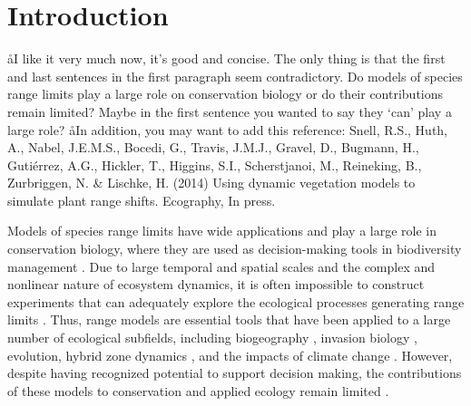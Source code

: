\section*{Introduction}
\aa{I like it very much now, it's good and concise. The only thing is that the first and last sentences in the first paragraph seem contradictory. Do models of species range limits play a large role on conservation biology or do their contributions remain limited? Maybe in the first sentence you wanted to say they ‘can’ play a large role? }
\aa{In addition, you may want to add this reference: Snell, R.S., Huth, A., Nabel, J.E.M.S., Bocedi, G., Travis, J.M.J., Gravel, D., Bugmann, H., Gutiérrez, A.G., Hickler, T., Higgins, S.I., Scherstjanoi, M., Reineking, B., Zurbriggen, N. \& Lischke, H. (2014) Using dynamic vegetation models to simulate plant range shifts. Ecography, In press.}

Models of species range limits have wide applications and play a large role in conservation biology, where they are used as decision-making tools in biodiversity management \citep{Rosenzweig2008, Thuiller2008, Rodenhouse2009}.
Due to large temporal and spatial scales and the complex and nonlinear nature of ecosystem dynamics, it is often impossible to construct experiments that can adequately explore the ecological processes generating range limits \citep{Wu1995, Levin1998}. 
Thus, range models are essential tools that have been applied to a large number of ecological subfields, including biogeography \citep{Schurr2012}, invasion biology \citep{Catterall2012, Gallien2012}, evolution, hybrid zone dynamics \citep{Engler2013}, and the impacts of climate change  \citep{Rosenzweig2008, Thuiller2008, Milad2011, Blois2013, Loyola2013}. 
However, despite having recognized potential to support decision making, the contributions of these models to conservation and applied ecology remain limited \citep{Dawson2011, Guisan2013}.

